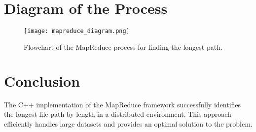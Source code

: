 \documentclass{article}
\begin{document}
\section{Diagram of the Process}
\begin{figure}[h!]
    \centering
    \texttt{[image: mapreduce\_diagram.png]}
    \caption{Flowchart of the MapReduce process for finding the longest path.}
\end{figure}

\section{Conclusion}
The C++ implementation of the MapReduce framework successfully identifies the longest file path by length in a distributed environment. This approach efficiently handles large datasets and provides an optimal solution to the problem.
\end{document}

